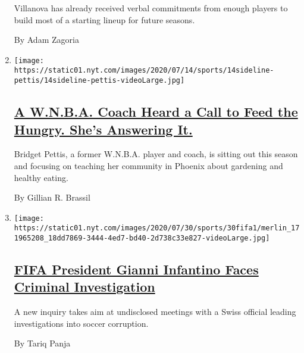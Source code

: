 \begin{enumerate}
  Villanova has already received verbal commitments from enough players
  to build most of a starting lineup for future seasons.

  By Adam Zagoria
\item
  \texttt{[image: https://static01.nyt.com/images/2020/07/14/sports/14sideline-pettis/14sideline-pettis-videoLarge.jpg]}

  \hypertarget{a-wnba-coach-heard-a-call-to-feed-the-hungry-shes-answering-it}{%
  \subsection{\texorpdfstring{\href{/2020/07/30/sports/basketball/wnba-bridget-pettis.html}{A
  W.N.B.A. Coach Heard a Call to Feed the Hungry. She's Answering
  It.}}{A W.N.B.A. Coach Heard a Call to Feed the Hungry. She's Answering It.}}\label{a-wnba-coach-heard-a-call-to-feed-the-hungry-shes-answering-it}}

  Bridget Pettis, a former W.N.B.A. player and coach, is sitting out
  this season and focusing on teaching her community in Phoenix about
  gardening and healthy eating.

  By Gillian R. Brassil
\item
  \texttt{[image: https://static01.nyt.com/images/2020/07/30/sports/30fifa1/merlin\_171965208\_18dd7869-3444-4ed7-bd40-2d738c33e827-videoLarge.jpg]}

  \hypertarget{fifa-president-gianni-infantino-faces-criminal-investigation}{%
  \subsection{\texorpdfstring{\href{/2020/07/30/sports/soccer/fifa-gianni-infantino-investigation.html}{FIFA
  President Gianni Infantino Faces Criminal
  Investigation}}{FIFA President Gianni Infantino Faces Criminal Investigation}}\label{fifa-president-gianni-infantino-faces-criminal-investigation}}

  A new inquiry takes aim at undisclosed meetings with a Swiss official
  leading investigations into soccer corruption.

  By Tariq Panja
\end{enumerate}


